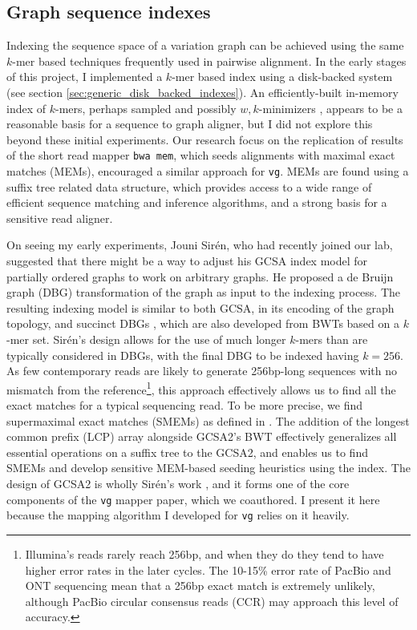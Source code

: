 \subsection{Graph sequence indexes}
\label{sec:graph_sequence_indexes}
Indexing the sequence space of a variation graph can be achieved using the same $k$-mer based techniques frequently used in pairwise alignment.
In the early stages of this project, I implemented a $k$-mer based index using a disk-backed system (see section \ref{sec:generic_disk_backed_indexes}).
An efficiently-built in-memory index of $k$-mers, perhaps sampled and possibly $w,k$-minimizers \cite{marccais2018asymptotically,li2018minimap2}, appears to be a reasonable basis for a sequence to graph aligner, but I did not explore this beyond these initial experiments.
Our research focus on the replication of results of the short read mapper {\tt bwa mem}, which seeds alignments with maximal exact matches (MEMs), encouraged a similar approach for {\tt vg}.
MEMs are found using a suffix tree related data structure, which provides access to a wide range of efficient sequence matching and inference algorithms, and a strong basis for a sensitive read aligner.

On seeing my early experiments, Jouni Sir\'{e}n, who had recently joined our lab, suggested that there might be a way to adjust his GCSA index model for partially ordered graphs to work on arbitrary graphs.
He proposed a de Bruijn graph (DBG) transformation of the graph as input to the indexing process.
The resulting indexing model is similar to both GCSA, in its encoding of the graph topology, and succinct DBGs \cite{bowe2012succinct}, which are also developed from BWTs based on a $k$-mer set.
Sir\'{e}n's design allows for the use of much longer $k$-mers than are typically considered in DBGs, with the final DBG to be indexed having $k=256$.
As few contemporary reads are likely to generate 256bp-long sequences with no mismatch from the reference\footnote{Illumina's reads rarely reach 256bp, and when they do they tend to have higher error rates in the later cycles. The 10-15\% error rate of PacBio and ONT sequencing mean that a 256bp exact match is extremely unlikely, although PacBio circular consensus reads (CCR) may approach this level of accuracy.}, this approach effectively allows us to find all the exact matches for a typical sequencing read.
To be more precise, we find supermaximal exact matches (SMEMs) as defined in \cite{li2013aligning}.
The addition of the longest common prefix (LCP) array alongside GCSA2's BWT effectively generalizes all essential operations on a suffix tree to the GCSA2, and enables us to find SMEMs and develop sensitive MEM-based seeding heuristics using the index.
The design of GCSA2 is wholly Sir\'{e}n's work \cite{siren2017indexing}, and it forms one of the core components of the {\tt vg} mapper paper, which we coauthored.
I present it here because the mapping algorithm I developed for {\tt vg} relies on it heavily.

